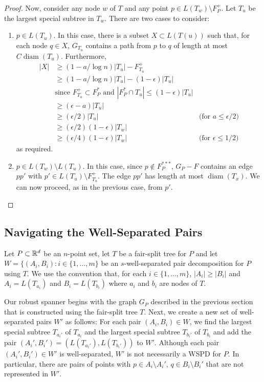 \documentclass{patmorin}
\DeclareMathOperator{\diam}{diam}
\begin{document}
\begin{proof}
  Now, consider any node $w$ of $T$ and any point $p\in L(T_w)\setminus
  F^+_P$.  Let $T_u$ be the largest special subtree in $T_w$.
  There are two cases to consider:
  \begin{enumerate}
    \item $p\in L(T_u)$. In this case, there is a subset $X\subset L(T(u))$
     such that, for each node $q\in X$, $G_{T_u}$ contains a path from
     $p$ to $q$ of length at most $C\diam(T_u)$. Furthermore,
    \begin{align*}
      |X| & \ge (1-a/\log n)|T_u| - F^+_{T_u} \\
          & \ge (1-a/\log n)|T_u| - (1-\epsilon)|T_u| \\
             & \text{since $F^+_{T_u} \subset F^*_P$ and $|F^*_P\cap T_u|\le (1-\epsilon)|T_u|$} \\
         & \ge (\epsilon-a)|T_u| \\ 
         & \ge (\epsilon/2)|T_u| 
           & \text{(for $a \le \epsilon/2$)}\\ 
         & \ge (\epsilon/2)(1-\epsilon)|T_w|  \\
         & \ge (\epsilon/4)(1-\epsilon)|T_w| 
           & \text{(for $\epsilon \le 1/2)$} 
    \end{align*}
    as required.

    \item $p\in L(T_w)\setminus L(T_u)$.  In this case, since $p\not\in
    F^{***}_P$, $G_P-F$ contains an edge $pp'$ with $p'\in L(T_u)\setminus
    F^{+}_{T_u}$.  The edge $pp'$ has length at most $\diam(T_x)$.
    We can now proceed, as in the previous case, from $p'$.
  \end{enumerate}
\end{proof}


\subsection{Navigating the Well-Separated Pairs}

Let $P\subset\mathbb{R}^d$ be an $n$-point set, let $T$ be a fair-split tree for
$P$ and let $W=\{(A_i,B_i):i\in\{1,\ldots,m\}$ be an $s$-well-separated
pair decomposition for $P$ using $T$. We use the convention that,
for each $i\in\{1,\ldots,m\}$, $|A_i|\ge |B_i|$ and $A_i=L(T_{a_i})$
and $B_i=L(T_{b_i})$ where $a_i$ and $b_i$ are nodes of $T$.

Our robust spanner begins with the graph $G_P$ described in the previous
section that is constructed using the fair-split tree $T$.  Next,
we create a new set of well-separated pairs $W'$ as follows:  For each
pair $(A_i,B_i)\in W$, we find the largest special subtree $T_{a_i'}$
of $T_{a_i}$ and the largest special subtree $T_{b_i'}$ of $T_{b_i}$
and add the pair $(A_i',B_i')=(L(T_{a_i'}),L(T_{b_i'}))$ to $W'$.
Although each pair $(A_i',B_i')\in W'$ is well-separated, $W'$ is not
necessarily a WSPD for $P$.  In particular, there are pairs of points
with $p\in A_i\setminus A_i'$, $q\in B_i\setminus B_i'$ that are not
represented in $W'$.
\end{document}
